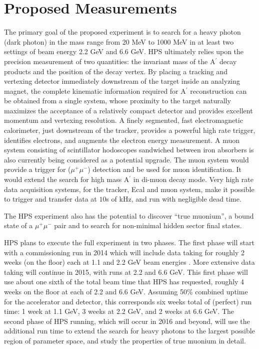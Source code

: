 \section{Proposed Measurements}
\label{sec:measurements}

The primary goal of the proposed experiment is to search for a heavy photon (dark photon) in the mass range from 20 MeV to 1000 MeV in at least two settings of beam energy 2.2 GeV and 6.6 GeV. 
HPS  ultimately relies upon the precision measurement of two quantities: the invariant mass of the A$^\prime$ decay products and the position of the decay vertex. By placing a tracking and vertexing detector immediately downstream of the target inside an analyzing magnet, the complete kinematic information required for A$^\prime$ reconstruction can be obtained from a single system, whose proximity to the target naturally maximizes the acceptance of a relatively compact detector and provides excellent momentum and vertexing resolution. A finely segmented, fast electromagnetic calorimeter, just downstream of the tracker,  provides a powerful high rate trigger, identifies electrons, and augments  the electron energy measurement. A muon system consisting of scintillator hodoscopes sandwiched between iron absorbers is also currently being considered as a potential upgrade. The muon system would provide a trigger for ($\mu^+\mu^-$) detection and  be used for muon identification. It would extend the search for high mass A$^\prime$ in di-muon decay mode. Very high rate data acquisition systems, for the tracker, Ecal and muon system, make it possible to trigger and transfer data at $10$s of kHz, and run with negligible dead time.

The HPS experiment also has the potential to discover ``true muonium'', a bound state of a $\mu^+ \mu^-$ pair and to search for non-minimal hidden sector final states.  

HPS plans to execute the full experiment in two phases. The first phase will start with a commissioning run in 2014 which will include data taking for roughly 2 weeks (on the floor) each at 1.1 and  2.2 GeV beam energies . More extensive data taking will continue in 2015, with runs at 2.2 and 6.6 GeV. This first phase will use about one sixth of the total beam time that HPS has requested, roughly 4 weeks on the floor at each of 2.2 and 6.6 GeV.  Assuming 50\% combined uptime for the accelerator and detector, this corresponds six weeks total of (perfect) run time:  1 week at 1.1 GeV, 3 weeks at 2.2 GeV, and 2 weeks at 6.6 GeV. The second phase of HPS running, which will occur in 2016 and beyond, will use the additional run time to extend the search for heavy photons to the largest possible region of parameter space, and study the properties of true muonium in detail.

